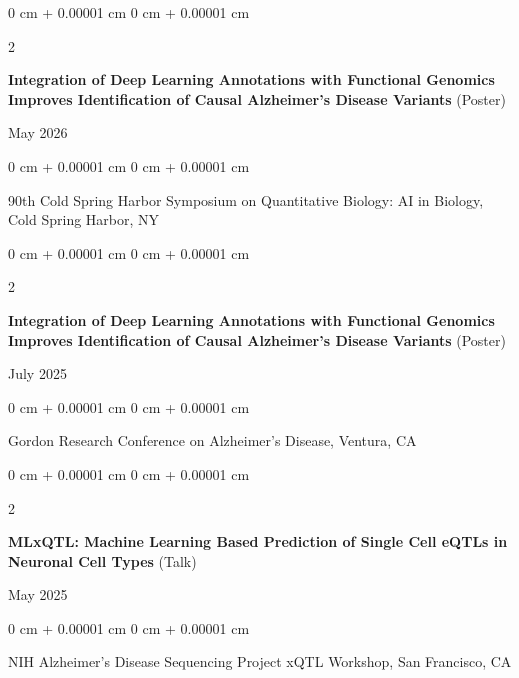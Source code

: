 \documentclass[10pt, letterpaper]{article}
\newenvironment{onecolentry}{
    \begin{adjustwidth}{
        0 cm + 0.00001 cm
    }{
        0 cm + 0.00001 cm
    }
}{
    \end{adjustwidth}
} %
\newenvironment{twocolentry}[2][]{
    \onecolentry
    \def\secondColumn{#2}
    \setcolumnwidth{\fill, 4.5 cm}
    \begin{paracol}{2}
}{
    \switchcolumn \raggedleft \secondColumn
    \end{paracol}
    \endonecolentry
} %
\begin{document}
    \begin{samepage}
        \begin{twocolentry}{
            May 2026
        }
            \textbf{Integration of Deep Learning Annotations with Functional Genomics Improves Identification of Causal Alzheimer's Disease Variants} (Poster)
        \end{twocolentry}

        \vspace{0.10 cm}

        \begin{onecolentry}
            90th Cold Spring Harbor Symposium on Quantitative Biology: AI in Biology, Cold Spring Harbor, NY
        \end{onecolentry}
    \end{samepage}

    \vspace{0.20 cm}

    \begin{samepage}
        \begin{twocolentry}{
            July 2025
        }
            \textbf{Integration of Deep Learning Annotations with Functional Genomics Improves Identification of Causal Alzheimer's Disease Variants} (Poster)
        \end{twocolentry}

        \vspace{0.10 cm}

        \begin{onecolentry}
            Gordon Research Conference on Alzheimer's Disease, Ventura, CA
        \end{onecolentry}
    \end{samepage}

    \vspace{0.20 cm}

    \begin{samepage}
        \begin{twocolentry}{
            May 2025
        }
            \textbf{MLxQTL: Machine Learning Based Prediction of Single Cell eQTLs in Neuronal Cell Types} (Talk)
        \end{twocolentry}

        \vspace{0.10 cm}

        \begin{onecolentry}
            NIH Alzheimer's Disease Sequencing Project xQTL Workshop, San Francisco, CA
        \end{onecolentry}
    \end{samepage}
\end{document}
